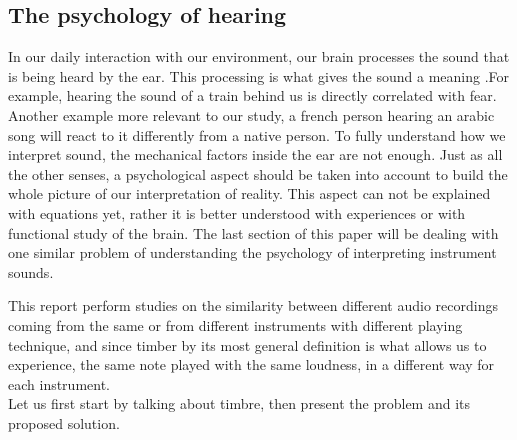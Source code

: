 \documentclass[hidelinks,12pt]{report}
\begin{document}
\subsection{The psychology of hearing}

In our daily interaction with our environment, our brain processes the sound that is being heard by the ear. This processing is what gives the sound a meaning .For example, hearing the sound of a train behind us is directly correlated with fear. Another example more relevant to our study, a french person hearing an arabic song will react to it differently from a native person. To fully understand how we interpret sound, the mechanical factors inside the ear are not enough. Just as all the other senses, a psychological aspect should be taken into account to build the whole picture of our interpretation of reality. This aspect can not be explained with equations yet, rather it is better understood with experiences or with functional study of the brain. The last section of this paper will be dealing with one similar problem of understanding the psychology of interpreting instrument sounds.\par 


This report perform studies on the similarity between different audio recordings coming from the same or from different instruments with different playing technique, and since timber by its most general definition is what allows us to experience, the same note played with the same loudness, in a different way for each instrument.\\ Let us first start by talking about  timbre, then present the problem and its proposed solution. 
\end{document}
